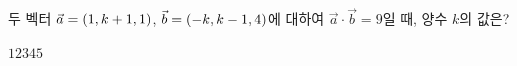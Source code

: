 두 벡터 $\vec{a}=(1{,}\mkern3mu\mathopen{}k+1{,}\mkern3mu\mathopen{}1)$, $\vec{b}=(-k{,}\mkern3mu\mathopen{}k-1{,}\mkern3mu\mathopen{}4)$에 대하여 $\vec{a}\cdot\vec{b}=9$일 때, 양수 $k$의 값은?
\begin{choices32}{$1$}{$2$}{$3$}{$4$}{$5$}\end{choices32}
